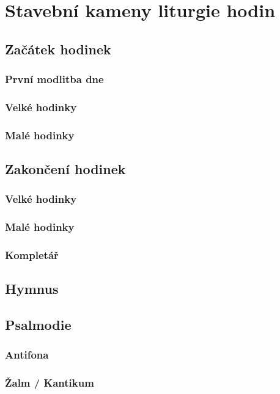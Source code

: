\section{Stavební kameny liturgie hodin}

\subsection{Začátek hodinek}
\label{sec:zacatek}
\subsubsection{První modlitba dne}
\subsubsection{Velké hodinky}
\subsubsection{Malé hodinky}

\subsection{Zakončení hodinek}
\label{sec:zakonceni}
\subsubsection{Velké hodinky}
\subsubsection{Malé hodinky}
\subsubsection{Kompletář}

\subsection{Hymnus}
\label{sec:hymnus}

\subsection{Psalmodie}
\label{sec:psalmodie}
\subsubsection{Antifona}
\subsubsection{Žalm / Kantikum}


